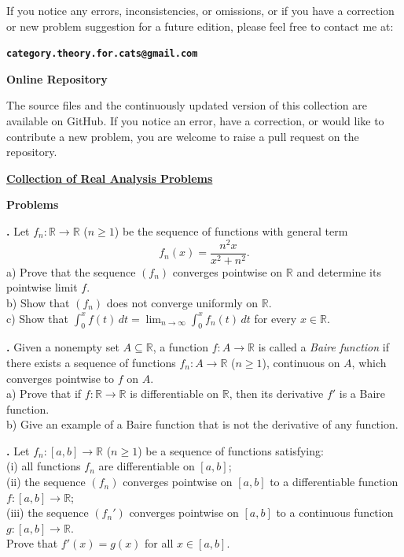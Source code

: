 \documentclass[12pt]{article}
\newcounter{raprob}
\newcommand{\raproblem}[1]{%
  \stepcounter{raprob}%
  \begin{problem}
  \textbf{\theraprob.} #1
  \end{problem}
}
\begin{document}
If you notice any errors, inconsistencies, or omissions, or if you have a
correction or new problem suggestion for a future edition, please feel free to contact me at:

\noindent
\textbf{\texttt{category.theory.for.cats@gmail.com}}

\medskip

\noindent
\textbf{Online Repository}

\medskip

The source files and the continuously updated version of this collection are available on GitHub. If you notice an error, have a correction, or would like to contribute a new problem, you are welcome to raise a pull request on the repository.

\medskip

\noindent
\href{https://github.com/ZetaZero-0/Collection-of-Problems}
{\textbf{Collection of Real Analysis Problems}}

\vfill

\newpage

\begin{center}
	{\LARGE\bfseries Problems}
\end{center}

\raproblem{Let $f_n : \mathbb{R} \to \mathbb{R}$ ($n \ge 1$) be the sequence of functions with general term
\[
f_n(x) = \frac{n^2 x}{x^2 + n^2}.
\]
a) Prove that the sequence $(f_n)$ converges pointwise on $\mathbb{R}$ and determine its pointwise limit $f$.\\
b) Show that $(f_n)$ does not converge uniformly on $\mathbb{R}$.\\
c) Show that $\displaystyle\int_0^x f(t)\,dt = \lim_{n \to \infty} \int_0^x f_n(t)\,dt$ for every $x \in \mathbb{R}$.}

\raproblem{Given a nonempty set $A \subseteq \mathbb{R}$, a function $f : A \to \mathbb{R}$ is called a \emph{Baire function} if there exists a sequence of functions $f_n : A \to \mathbb{R}$ ($n \ge 1$), continuous on $A$, which converges pointwise to $f$ on $A$.\\
a) Prove that if $f : \mathbb{R} \to \mathbb{R}$ is differentiable on $\mathbb{R}$, then its derivative $f'$ is a Baire function.\\
b) Give an example of a Baire function that is not the derivative of any function.}

\raproblem{Let $f_n : [a,b] \to \mathbb{R}$ ($n \ge 1$) be a sequence of functions satisfying:\\
(i) all functions $f_n$ are differentiable on $[a,b]$;\\
(ii) the sequence $(f_n)$ converges pointwise on $[a,b]$ to a differentiable function $f : [a,b] \to \mathbb{R}$;\\
(iii) the sequence $(f_n')$ converges pointwise on $[a,b]$ to a continuous function $g : [a,b] \to \mathbb{R}$.\\
Prove that $f'(x) = g(x)$ for all $x \in [a,b]$.}
\end{document}
